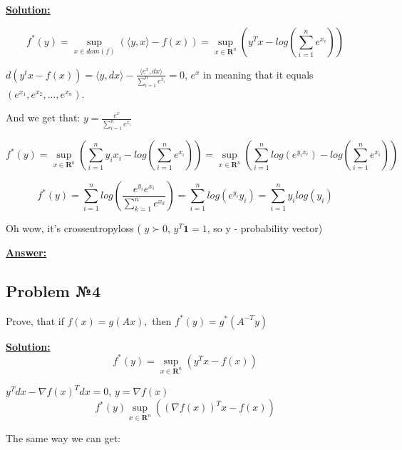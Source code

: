 \underline{\textbf{Solution:}}

\begin{equation*}
    f^*(y) = \sup_{x \in dom(f)} \left( 
    \langle y, x \rangle - f(x) \right) = \sup_{x \in \mathbf{R}^n} \left( y^Tx - log \left( \sum\limits_{i=1}^n e^{x_i}\right)
    \right)
\end{equation*}

$d(y^tx - f(x)) = \langle y, dx \rangle - \frac{\langle e^x, dx \rangle}{\sum\limits_{i=1}^n e^{x_i}}=0$,  $e^x$ in meaning that it equals $(e^{x_1}, e^{x_2}, ..., e^{x_n})$.

And we get that: $y = \frac{e^x}{\sum\limits_{i=1}^n e^{x_i}}$

\begin{equation*}
    f^*(y) = \sup_{x \in \mathbf{R}^n} \left(\sum\limits_{i=1}^n y_ix_i - log \left( \sum\limits_{i=1}^n e^{x_i}\right) \right) = \sup_{x \in \mathbf{R}^n} \left(\sum\limits_{i=1}^n log(e^{y_ix_i}) - log \left( \sum\limits_{i=1}^n e^{x_i}\right) \right) 
\end{equation*}

\begin{equation*}
    f^*(y) = \sum\limits_{i=1}^n log \left( \frac{e^{y_i}e^{x_i}}{\sum\limits_{k=1}^n e^{x_k}} \right) = \sum\limits_{i=1}^n log \left( e^{y_i}y_i \right) = \sum\limits_{i=1}^n y_i log(y_i) 
\end{equation*}

Oh wow, it's crossentropyloss ( $y \succ 0$, $y^T\mathbf{1} = 1$, so y - probability vector)


\underline{\textbf{Answer:}}

\subsection{Problem №4}
Prove, that if $f(x) = g(Ax),$ then $f^*(y) = g^*(A^{-T}y)$

\underline{\textbf{Solution:}}
\begin{equation*}
f^*(y) = \sup_{x \in \mathbf{R}^n}\left(y^Tx - f(x)  \right)
\end{equation*}

$y^Tdx - \nabla f(x)^Tdx = 0$, $y = \nabla f(x)$
\begin{equation*}
    f^*(y) \sup_{x \in \mathbf{R}^n} \left( (\nabla f(x))^Tx - f(x) \right)
\end{equation*}

The same way we can get:

